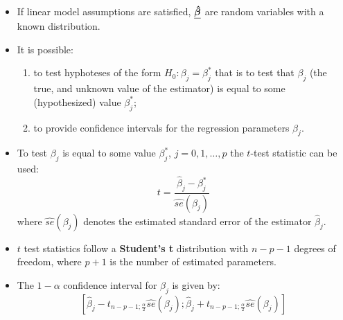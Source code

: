 
\begin{frame}
  \begin{itemize}
    \vspace{0.5cm}
    \item If linear model assumptions are satisfied, $ \boldsymbol{\underline{\hat{\beta}}} $ are random variables with a known distribution.
    \vspace{0.5cm}
    \item It is possible:
      \begin{enumerate}
        \vspace{0.25cm}
        \item to test hyphoteses of the form $ H_0: \beta_j = \beta_j^* $ that is to test that $ \beta_j $ (the true, and unknown value of the estimator) is equal to some (hypothesized) value $ \beta_j^* $;
        \vspace{0.25cm}
        \item to provide confidence intervals for the regression parameters $ \beta_j $.
      \end{enumerate}
  \end{itemize}
\end{frame}

\begin{frame}
  \begin{itemize}
    \vspace{0.25cm}
    \item To test $ \beta_j $ is equal to some value $ \beta_j^* $, $ j = 0, 1, \dots, p $ the $t$-test statistic can be used:
      $$ t = \frac{\hat{\beta}_j-\beta_j^*}{\hat{se}(\beta_j)} $$
      where $ \hat{se}(\beta_j) $ denotes the estimated standard error of the estimator $ \hat{\beta}_j $.
    \vspace{0.25cm}
    \item $ t $ test statistics follow a \textbf{Student's t} distribution with $ n - p - 1 $ degrees of freedom, where $ p + 1 $ is the number of estimated parameters.
    \vspace{0.25cm}
    \item The $ 1 - \alpha $ confidence interval for $ \beta_j $ is given by:
      $$ [\hat{\beta}_j - t_{n-p-1;\frac{\alpha}{2}} \hat{se}(\beta_j); \hat{\beta}_j + t_{n-p-1;\frac{\alpha}{2}} \hat{se}(\beta_j)] $$
  \end{itemize}
\end{frame}



